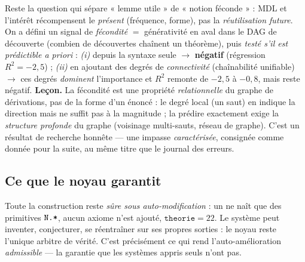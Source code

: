 Reste la question qui sépare « lemme utile » de « notion féconde » : MDL et
l'intérêt récompensent le \emph{présent} (fréquence, forme), pas la
\emph{réutilisation future}. On a défini un signal de \emph{fécondité} $=$
générativité en aval dans le DAG de découverte (combien de découvertes chaînent un
théorème), puis \emph{testé s'il est prédictible a priori} :
\emph{(i)} depuis la syntaxe seule $\to$ \textbf{négatif} (régression $R^2=-2{,}5$) ;
\emph{(ii)} en ajoutant des degrés de \emph{connectivité} (chaînabilité unifiable) $\to$
ces degrés \emph{dominent} l'importance et $R^2$ remonte de $-2{,}5$ à $-0{,}8$,
mais reste négatif. \textbf{Leçon.} La fécondité est une propriété
\emph{relationnelle} du graphe de dérivations, pas de la forme d'un énoncé : le
degré local (un saut) en indique la direction mais ne suffit pas à la magnitude ;
la prédire exactement exige la \emph{structure profonde} du graphe (voisinage
multi-sauts, réseau de graphe). C'est un résultat de recherche honnête --- une
impasse \emph{caractérisée}, consignée comme donnée pour la suite, au même titre
que le journal des erreurs.

\subsection{Ce que le noyau garantit}

Toute la construction reste \emph{sûre sous auto-modification} : un
\theoreme{} ne naît que des primitives $\texttt{N.*}$, aucun axiome n'est ajouté,
$\texttt{theorie}=22$. Le système peut inventer, conjecturer, se réentraîner sur
ses propres sorties : le noyau reste l'unique arbitre de vérité. C'est
précisément ce qui rend l'auto-amélioration \emph{admissible} --- la garantie que
les systèmes appris seuls n'ont pas.
